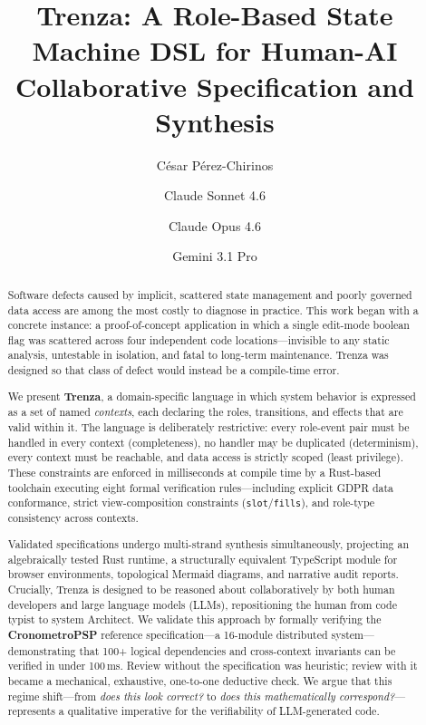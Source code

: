 \documentclass[sigplan,10pt,review,anonymous]{acmart}
\title{Trenza: A Role-Based State Machine DSL for Human-AI Collaborative
       Specification and Synthesis}
\author{César Pérez-Chirinos}
\affiliation{\institution{Independent researcher}\country{Spain}}
\author{Claude Sonnet 4.6}
\affiliation{\institution{Anthropic}\country{USA}}
\author{Claude Opus 4.6}
\affiliation{\institution{Anthropic}\country{USA}}
\author{Gemini 3.1 Pro}
\affiliation{\institution{Google DeepMind}\country{USA}}
\begin{document}
\begin{abstract}
Software defects caused by implicit, scattered state management and poorly
governed data access are among the most costly to diagnose in practice. This
work began with a concrete instance: a proof-of-concept application in which a
single edit-mode boolean flag was scattered across four independent code
locations---invisible to any static analysis, untestable in
isolation, and fatal to long-term maintenance. Trenza was designed so that
class of defect would instead be a compile-time error.

We present \textbf{Trenza}, a domain-specific language in which system behavior
is expressed as a set of named \emph{contexts}, each declaring the roles,
transitions, and effects that are valid within it. The language is deliberately
restrictive: every role-event pair must be handled in every context
(completeness), no handler may be duplicated (determinism), every context must
be reachable, and data access is strictly scoped (least privilege). These
constraints are enforced in milliseconds at compile time by a Rust-based
toolchain executing eight formal verification rules---including explicit GDPR
data conformance, strict view-composition constraints (\texttt{slot}/\texttt{fills}),
and role-type consistency across contexts.

Validated specifications undergo multi-strand synthesis simultaneously,
projecting an algebraically tested Rust runtime, a structurally equivalent
TypeScript module for browser environments, topological Mermaid diagrams, and
narrative audit reports. Crucially, Trenza is designed to be reasoned about
collaboratively by both human developers and large language models (LLMs),
repositioning the human from code typist to system Architect. We validate this
approach by formally verifying the \textbf{CronometroPSP} reference
specification---a 16-module distributed system---demonstrating that 100+
logical dependencies and cross-context invariants can be verified in under
100\,ms. Review without the specification was heuristic; review with it became
a mechanical, exhaustive, one-to-one deductive check. We argue that this regime
shift---from \emph{does this look correct?} to \emph{does this mathematically
correspond?}---represents a qualitative imperative for the verifiability of
LLM-generated code.
\end{abstract}

\maketitle
\end{document}
